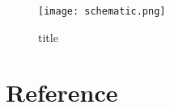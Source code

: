 \begin{figure}[ht]
    \centering
    \texttt{[image: schematic.png]}
    \caption{title}
    \label{schematic}
\end{figure}

\section{Reference}

